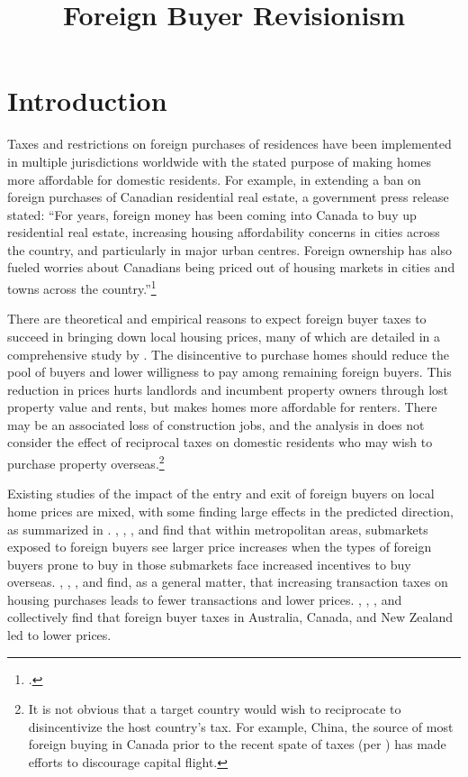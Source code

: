 \documentclass[12pt]{article}
\begin{document}
\title{Foreign Buyer Revisionism}

\section{Introduction}

Taxes and restrictions on foreign purchases of residences have been implemented in multiple jurisdictions worldwide with the stated purpose of making homes more affordable for domestic residents. For example, in extending a ban on foreign purchases of Canadian residential real estate, a government press release stated: ``For years, foreign money has been coming into Canada to buy up residential real estate, increasing housing affordability concerns in cities across the country, and particularly in major urban centres. Foreign ownership has also fueled worries about Canadians being priced out of housing markets in cities and towns across the country.''\footnote{\textcite{gOC}.}

There are theoretical and empirical reasons to expect foreign buyer taxes to
succeed in bringing down local housing prices, many of which are detailed in a
comprehensive study by \textcite{favilukisVanNieuwerburgh}. The disincentive to
purchase homes should reduce the pool of buyers and lower willigness to pay
among remaining foreign buyers. This reduction in prices hurts landlords and
incumbent property owners through lost property value and rents, but makes
homes more affordable for renters. There may be an associated loss of
construction jobs, and the analysis in \textcite{favilukisVanNieuwerburgh} does
not consider the effect of reciprocal taxes on domestic residents who may wish
to purchase property overseas.\footnote{It is not obvious that a target country
would wish to reciprocate to disincentivize the host country's tax. For
example, China, the source of most foreign buying in Canada prior to the recent
spate of taxes (per \textcite{ctvNews}) has made efforts to discourage capital
flight.}

Existing studies of the impact of the entry and exit of foreign buyers on local
home prices are mixed, with some finding large effects in the predicted
direction, as summarized in \textcite{davidoffZheng}. \textcite{LiShenZhang},
\textcite{gorbackGlobalCapitalLocal2020}, \textcite{pavlovImmigrationFlows},
and \textcite{BadarinzaRamadorai} find that within metropolitan areas,
submarkets exposed to foreign buyers see larger price increases when the types
of foreign buyers prone to buy in those submarkets face increased incentives to
buy overseas. \textcite{DachisDurantonTurner}, \textcite{klevenBest},
\textcite{kopczukMunroe}, and \textcite{davidoffLeigh} find, as a general
matter, that increasing transaction taxes on housing purchases leads to fewer
transactions and lower prices. \textcite{HartleyForeign},
\textcite{andalfattoEstimatingEffectMetro2023}, \textcite{DuYinZhang}, and
\textcite{pavlovForeignBuyerTaxes} collectively find that foreign buyer taxes
in Australia, Canada, and New Zealand led to lower prices.
\end{document}
